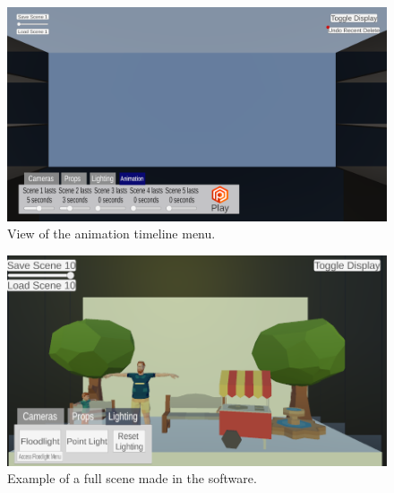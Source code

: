 \documentclass[10pt,twocolumn]{article}
\begin{document}
\begin{figure}
    \includegraphics[width=.75\linewidth]{timeline.png}
\centering
    \caption{
        View of the animation timeline menu.
    }
    \label{fig:Fig4}
\end{figure}

\begin{figure}
    \includegraphics[width=.75\linewidth]{fullscene.png}
\centering
    \caption{
        Example of a full scene made in the software.
    }
    \label{fig:Fig5}
\end{figure}
\end{document}
